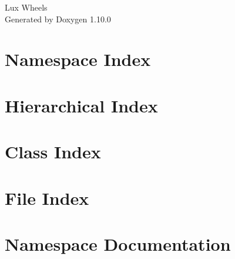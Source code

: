 \documentclass[twoside]{book}
\newcommand{\+}{\discretionary{\mbox{\scriptsize$\hookleftarrow$}}{}{}}
\newcommand{\clearemptydoublepage}{%
    \newpage{\pagestyle{empty}\cleardoublepage}%
  }
\begin{document}
  \raggedbottom
    \hypersetup{pageanchor=false,
                bookmarksnumbered=true,
                pdfencoding=unicode
               }
  \begin{titlepage}
  \vspace*{7cm}
  \begin{center}%
  {\Large Lux Wheels}\\
  \vspace*{1cm}
  {\large Generated by Doxygen 1.10.0}\\
  \end{center}
  \end{titlepage}
  \clearemptydoublepage
  \tableofcontents
  \clearemptydoublepage
  \hypersetup{pageanchor=true}
\chapter{Namespace Index}

\chapter{Hierarchical Index}

\chapter{Class Index}

\chapter{File Index}

\chapter{Namespace Documentation}













\end{document}
